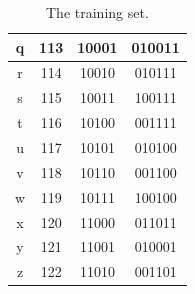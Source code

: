 \documentclass[%
    corpo=11pt,
    twoside,
    stile=classica,
    oldstyle,
    autoretitolo,
    tipotesi=magistrale,
    greek,
    evenboxes,
    english
]{toptesi}
\begin{document}
\begin{table}[]
\begin{tabular}{|c|c|c|c|}
q             & 113                                                           & 10001                                                                        & 010011                                                                       \\ \hline
r             & 114                                                           & 10010                                                                        & 010111                                                                       \\ \hline
s             & 115                                                           & 10011                                                                        & 100111                                                                       \\ \hline
t             & 116                                                           & 10100                                                                        & 001111                                                                       \\ \hline
u             & 117                                                           & 10101                                                                        & 010100                                                                       \\ \hline
v             & 118                                                           & 10110                                                                        & 001100                                                                       \\ \hline
w             & 119                                                           & 10111                                                                        & 100100                                                                       \\ \hline
x             & 120                                                           & 11000                                                                        & 011011                                                                       \\ \hline
y             & 121                                                           & 11001                                                                        & 010001                                                                       \\ \hline
z             & 122                                                           & 11010                                                                        & 001101                                                                       \\ \hline
\end{tabular}
\caption{The training set.}
\label{table:traingset}
\end{table}
\end{document}
